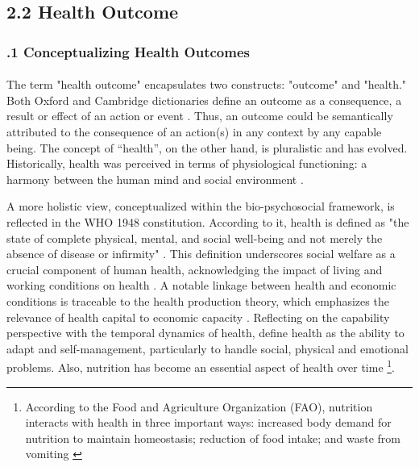 \subsection*{2.2 Health Outcome}
\subsubsection*{.1 Conceptualizing Health Outcomes}

\paragraph{}The term "health outcome" encapsulates two constructs: "outcome" and "health." Both Oxford and Cambridge dictionaries define an outcome as a consequence, a result or effect of an action or event \parencite{cambridge_dictionary_outcome_2023, oxford_dictionary_outcome_nodate}. Thus, an outcome could be semantically attributed to the consequence of an action(s) in any context by any capable being. The concept of “health”, on the other hand, is pluralistic and has evolved. Historically, health was perceived in terms of physiological functioning: a harmony between the human mind and social environment \parencite{svalastog_concepts_2017}. 

A more holistic view, conceptualized within the bio-psychosocial framework, is reflected in the WHO 1948 constitution. According to it, health is defined as "the state of complete physical, mental, and social well-being and not merely the absence of disease or infirmity" \parencite{who_constitution_1946}. This definition underscores social welfare as a crucial component of human health, acknowledging the impact of living and working conditions on health \parencite{svalastog_concepts_2017}. A notable linkage between health and economic conditions is traceable to the health production theory, which emphasizes the relevance of health capital to economic capacity \parencite{grossman_concept_1972}. Reflecting on the capability perspective with the temporal dynamics of health, \textcite{huber_how_2011} define health as the ability to adapt and self-management, particularly to handle social, physical and emotional problems. Also, nutrition has become an essential aspect of health over time \parencite{gamble_why_2008} \footnote{According to the Food and Agriculture Organization (FAO), nutrition interacts with health in three important ways: increased body demand for nutrition to maintain homeostasis; reduction of food intake; and waste from vomiting \parencite{fao_study_1996}}. 

